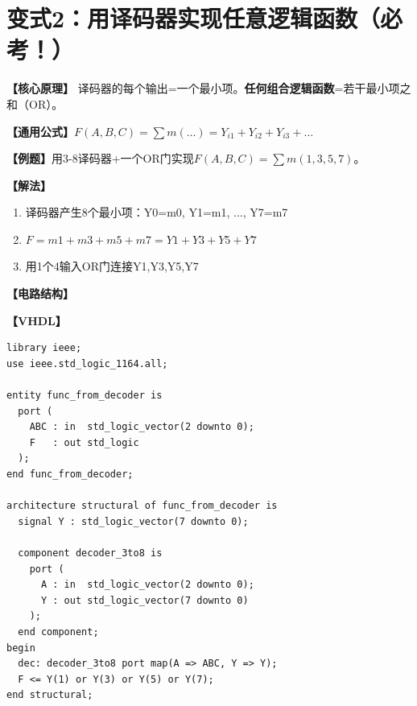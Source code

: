 \section{变式2：用译码器实现任意逻辑函数（必考！）}

\begin{detailbox}[完整教学]

\textbf{【核心原理】}
译码器的每个输出=一个最小项。\textbf{任何组合逻辑函数}=若干最小项之和（OR）。

\textbf{【通用公式】}$F(A,B,C) = \sum m(\dots)= Y_{i1}+Y_{i2}+Y_{i3}+\dots$

\textbf{【例题】}用3-8译码器+一个OR门实现$F(A,B,C)=\sum m(1,3,5,7)$。

\textbf{【解法】}
\begin{enumerate}
  \item 译码器产生8个最小项：Y0=m0, Y1=m1, ..., Y7=m7
  \item $F = m1+m3+m5+m7 = Y1+Y3+Y5+Y7$
  \item 用1个4输入OR门连接Y1,Y3,Y5,Y7
\end{enumerate}

\textbf{【电路结构】}
\begin{center}
\end{center}

\textbf{【VHDL】}
\begin{lstlisting}
library ieee;
use ieee.std_logic_1164.all;

entity func_from_decoder is
  port (
    ABC : in  std_logic_vector(2 downto 0);
    F   : out std_logic
  );
end func_from_decoder;

architecture structural of func_from_decoder is
  signal Y : std_logic_vector(7 downto 0);

  component decoder_3to8 is
    port (
      A : in  std_logic_vector(2 downto 0);
      Y : out std_logic_vector(7 downto 0)
    );
  end component;
begin
  dec: decoder_3to8 port map(A => ABC, Y => Y);
  F <= Y(1) or Y(3) or Y(5) or Y(7);
end structural;
\end{lstlisting}


\end{detailbox}

